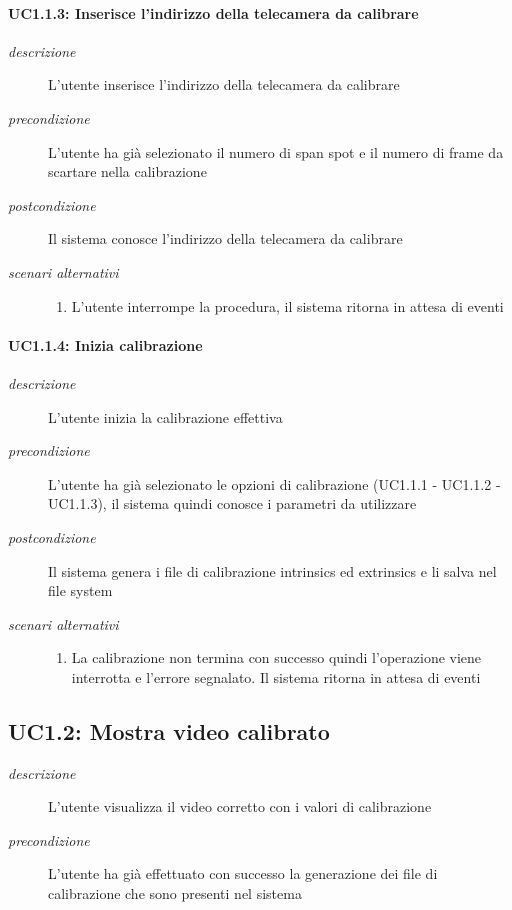 \paragraph{UC1.1.3: Inserisce l'indirizzo della telecamera da calibrare} \label{sec:uc1.1.3}
\begin{description}
 \item[\em{descrizione}] L'utente inserisce l'indirizzo della telecamera da calibrare
 \item[\em{precondizione}] L'utente ha già selezionato il numero di span spot e il numero di frame da scartare nella calibrazione
 \item[\em{postcondizione}] Il sistema conosce l'indirizzo della telecamera da calibrare
  \item[\em{scenari alternativi}]  \mbox{}  \begin{enumerate}
  \item L'utente interrompe la procedura, il sistema ritorna in attesa di eventi
  \end{enumerate}
 \end{description}

\paragraph{UC1.1.4: Inizia calibrazione} \label{sec:uc1.1.4}
\begin{description}
 \item[\em{descrizione}] L'utente inizia la calibrazione effettiva
 \item[\em{precondizione}] L'utente ha già selezionato le opzioni di calibrazione (UC1.1.1 - UC1.1.2 - UC1.1.3), il sistema quindi conosce i parametri da utilizzare
 \item[\em{postcondizione}] Il sistema genera i file di calibrazione intrinsics ed extrinsics e li salva nel file system
   \item[\em{scenari alternativi}]  \mbox{}
    \begin{enumerate} 
  \item La calibrazione non termina con successo quindi l'operazione viene interrotta e l'errore segnalato. Il sistema ritorna in attesa di eventi
  \end{enumerate}
 \end{description}

\subsection{UC1.2: Mostra video calibrato} \label{sec:uc1.2}
\begin{description}
 \item[\em{descrizione}] L'utente visualizza il video corretto con i valori di calibrazione
 \item[\em{precondizione}] L'utente ha già effettuato con successo la generazione dei file di calibrazione che sono presenti nel sistema
 
\end{description}


